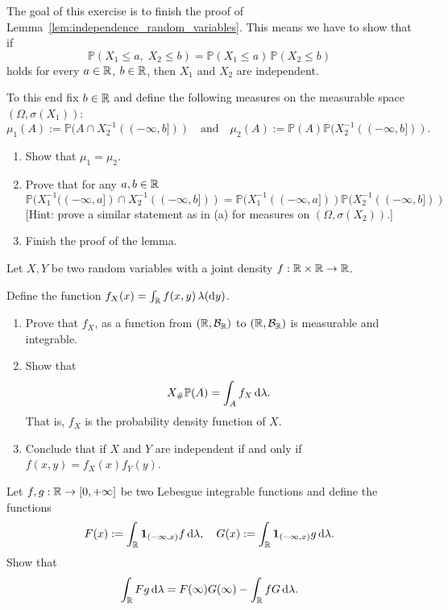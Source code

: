 \begin{problem}\label{prb:independence_random_variables}
The goal of this exercise is to finish the proof of Lemma~\ref{lem:independence_random_variables}. This means we have to show that if
\[
	\mathbb{P}( X_1 \leq a,\; X_2 \leq b ) = \mathbb{P}(X_1 \leq a)\, \mathbb{P}(X_2 \leq b)
\]
holds for every $a \in \mathbb R$, $b \in \mathbb R$, then $X_1$ and $X_2$ are independent.

To this end fix $b \in \mathbb R$ and define the following measures on the measurable space $(\Omega, \sigma(X_1))$:
\[
	\mu_1(A) := \mathbb{P}(A \cap X_2^{-1}((-\infty, b])) \quad \text{and} \quad 
	\mu_2(A) := \mathbb{P}(A)\mathbb{P}(X_2^{-1}((-\infty, b])).
\]
\begin{enumerate}[label={(\alph*)}]
\item Show that $\mu_1 = \mu_2$.
\item Prove that for any $a, b \in \mathbb R$
\[
	\mathbb{P}(X_1^{-1}((-\infty,a]) \cap X_2^{-1}((-\infty, b])) 
	= \mathbb{P}(X_1^{-1}((-\infty,a]))\mathbb{P}(X_2^{-1}((-\infty,b]))
\]
[Hint: prove a similar statement as in (a) for measures on $(\Omega, \sigma(X_2))$.]
\item Finish the proof of the lemma.
\end{enumerate}
\end{problem}

\begin{problem}\label{prb:joint_pdfs}
Let $X,Y$ be two random variables with a joint density $f : \mathbb R \times \mathbb R \to \mathbb R$. 

Define the function $f_X(x) = \int_{\mathbb R} f(x,y) \, \lambda(\mathrm{d} y)$.
\begin{enumerate}[label={(\alph*)}]
\item Prove that $f_X$, as a function from $(\mathbb R, \mathcal B_{\mathbb R})$ to $(\mathbb R, \mathcal B_{\mathbb R})$ is measurable and integrable.
\item Show that
\[
	X_\# \mathbb P (A) = \int_A f_X \, \mathrm{d} \lambda.
\]
That is, $f_X$ is the probability density function of $X$.
\item Conclude that if $X$ and $Y$ are independent if and only if $f(x,y) = f_X(x) f_Y(y)$.
\end{enumerate}
\end{problem}

\begin{problem}
Let $f,g : \mathbb R \to [0,+\infty]$ be two Lebesgue integrable functions and define the functions
\[
	F(x) := \int_{\mathbb R} \mathbf{1}_{(-\infty,x)} f \, \mathrm{d} \lambda, \quad
	G(x) := \int_{\mathbb R} \mathbf{1}_{(-\infty,x)} g \, \mathrm{d} \lambda.
\]
Show that
\[
	\int_{\mathbb R} F g \, \mathrm{d} \lambda = F(\infty) G(\infty) - \int_{\mathbb R} f G \, \mathrm{d} \lambda.
\]
\end{problem}

